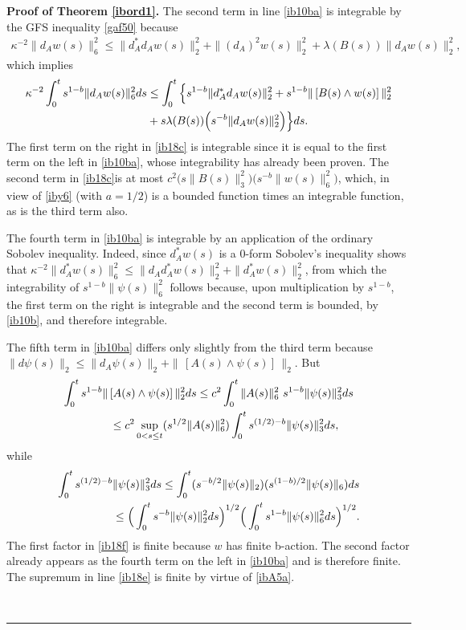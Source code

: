 \documentclass[12pt]{article}
\newenvironment{proof}[1][Proof]{\textbf{#1.} }{\ \rule{0.5em}{0.5em}}
\def \eref{\eqref}
\numberwithin{equation}{section}
\begin{document}
\begin{proof}[Proof of Theorem \ref{ibord1}]
   The second  term in line
\eref{ib10ba} is integrable by the GFS inequality \eref{gaf50}  because
\begin{align}
\kappa^{-2} \|d_A w(s)\|_6^2 \le \|d_A^* d_A w(s)\|_2^2 + \|(d_A)^2 w(s)\|_2^2 + \lambda(B(s))
\|d_A w(s)\|_2^2,                
\end{align}
which implies
\begin{align}
\kappa^{-2} \int_0^t s^{1-b} \|d_A w(s)\|_6^2 ds 
&\le \int_0^t  \Big\{s^{1-b}\|d_A^* d_A w(s) \|_2^2 + s^{1-b}\|\, [ B(s) \wedge w(s)]\, \|_2^2  \notag\\
&+ s\lambda(B(s))  \Big(s^{-b} \| d_A w(s)\|_2^2\Big) \Big\} ds .      \label{ib18c}
\end{align}
The first term on the right in \eref{ib18c} is integrable since it is equal to the first term on the left in \eref{ib10ba}, whose integrability has already been proven.
The second term  in \eref{ib18c}is at most 
 $c^2\Big(s\|B(s)\|_3^2\Big) \Big(s^{-b} \|w(s)\|_6^2\Big)$,  which, 
 in view of     \eref{iby6} (with $a = 1/2$)  
  is a bounded function times an integrable function, as is the  third term also.
 
  
     The fourth term in \eref{ib10ba} is integrable by an application of the ordinary
  Sobolev inequality.    
    Indeed, since  $d_A^* w(s)$ is a 0-form
   Sobolev's inequality  shows that   
 $ \kappa^{-2}\| d_A^* w(s) \|_6^2  \le  \| d_A d_A^* w(s)\|_2^2   + \| d_A^* w(s)\|_2^2$,
from which the integrability of $s^{1-b} \| \psi(s)\|_6^2$   
  follows because, upon multiplication by $s^{1-b}$, 
 the first term on the right is integrable and the second term is bounded, by \eref{ib10b}, 
  and therefore integrable. 

      The fifth term in \eref{ib10ba} differs only slightly from the third term because
       $\|d\psi(s)\|_2 \le \|d_A\psi(s)\|_2 + \| \, [ A(s)\wedge \psi(s)]\,\|_2$.
       But 
    \begin{align}
       \int_0^t s^{1-b}  \| \, &[ A(s)\wedge \psi(s)]\,\|_2^2 ds 
       \le  c^2\int_0^t   \|  A(s)\|_6^2\  s^{1-b} \|\psi(s)\|_3^2 ds  \notag \\
 &\le c^2 \sup_{0 < s \le t} (s^{1/2} \|A(s)\|_6^2)\int_0^t s^{(1/2)- b}\|\psi(s)\|_3^2 ds, \label{ib18e}
       \end{align}   
 while
 \begin{align}      
   \int_0^t s^{(1/2)- b}&\|\psi(s)\|_3^2 ds 
   \le \int_0^t(s^{-b/2} \|\psi(s)\|_2) ( s^{(1-b)/2} \| \psi(s)\|_6)ds   \notag\\
   &\le \Big(\int_0^t s^{-b} \| \psi(s)\|_2^2 ds \Big)^{1/2} 
   \Big(\int_0^t s^{1-b} \| \psi(s)\|_6^2 ds \Big)^{1/2}  .     \label{ib18f}
 \end{align}      
 The first factor in \eref{ib18f} is finite because $w$ has finite b-action. 
 The second factor already appears as the fourth term on the left in  \eref{ib10ba} and is therefore finite.
 The supremum in line \eref{ib18e} is finite by virtue of \eref{ibA5a}. 
 

\end{proof}
\end{document}
